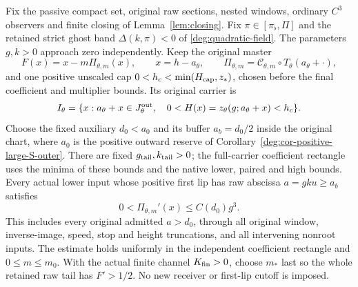 \begin{proposition}
\label{bp-tail:prop-actual-raw-tail}
Fix the passive compact set, original raw sections, nested windows,
ordinary \(C^3\) observers and finite closing of Lemma~\ref{lem:closing}.
Fix \(\pi\in[\pi_\flat,\Pi]\) and the retained strict ghost band
\(\Delta(k,\pi)<0\) of \eqref{deg:quadratic-field}. The parameters
\(g,k>0\) approach zero independently. Keep the original master
\[
 F(x)=x-m\Pi_{\theta,m}(x),\qquad x=h-a_\theta,
 \qquad \Pi_{\theta,m}=\mathcal C_{\theta,m}\circ T_\theta(a_\theta+\cdot),
\]
and one positive unscaled cap
\(0<h_c<\min(H_{\rm cap},z_*)\), chosen before the final coefficient
and multiplier bounds. Its original carrier is
\begin{equation}\label{bp-tail:original-carrier}
 I_\theta=\{x:a_\theta+x\in J_\theta^{\rm out},\quad
                         0<H(x)=z_\theta(g;a_\theta+x)<h_c\}.
\end{equation}
Choose the fixed auxiliary \(d_0<a_0\) and its buffer \(a_b=d_0/2\)
inside the original chart, where \(a_0\) is the positive outward
reserve of Corollary~\ref{deg:cor-positive-large-S-outer}.
There are fixed \(g_{\rm tail},k_{\rm tail}>0\);
the full-carrier coefficient rectangle uses the minima of these bounds
and the native lower, paired and high bounds. Every actual lower input whose positive first
lip has raw abscissa \(a=gku\ge a_b\) satisfies
\begin{equation}\label{bp-tail:consumed-derivative}
                   0<\Pi_{\theta,m}'(x)\le C(d_0)g^3.
\end{equation}
This includes every original admitted \(a>d_0\), through all original
window, inverse-image, speed, stop and height truncations, and all
intervening nonroot inputs. The estimate holds uniformly in the independent
coefficient rectangle and \(0\le m\le m_0\). With the actual finite
channel \(K_{\rm fin}>0\), choose \(m_*\) last so the whole retained
raw tail has \(F'>1/2\). No new receiver or first-lip cutoff is imposed.
\end{proposition}

